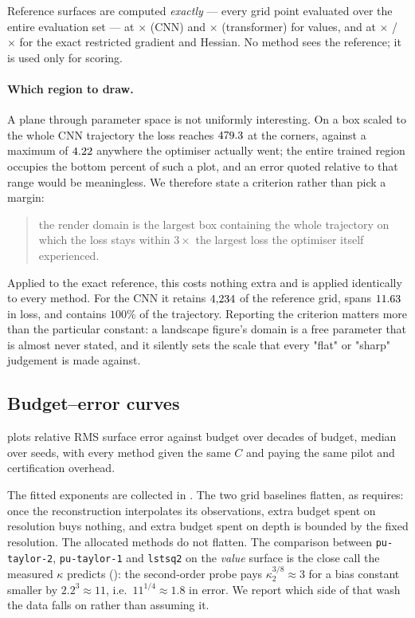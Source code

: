 \documentclass[11pt]{article}
\theoremstyle{definition}
\begin{document}
Reference surfaces are computed \emph{exactly} --- every grid point evaluated over the
entire evaluation set --- at \CNNvres$\times$\CNNvres{} (CNN) and
\GPTvres$\times$\GPTvres{} (transformer) for values, and at
\CNNdres$\times$\CNNdres{} / \GPTdres$\times$\GPTdres{} for the exact restricted
gradient and Hessian. No method sees the reference; it is used only for scoring.

\paragraph{Which region to draw.} A plane through parameter space is not uniformly
interesting. On a box scaled to the whole CNN trajectory the loss reaches
$479.3$ at the corners, against a maximum of $4.22$ anywhere the optimiser
actually went; the entire trained region occupies the bottom percent of such a plot, and
an error quoted relative to that range would be meaningless. We therefore state a
criterion rather than pick a margin:

\begin{quote}
the render domain is the largest box containing the whole trajectory on which the loss
stays within $3\times$ the largest loss the optimiser itself experienced.
\end{quote}

Applied to the exact reference, this costs nothing extra and is applied identically to
every method. For the CNN it retains $4{,}234$ of the reference grid, spans
$11.63$ in loss, and contains $100\%$ of the trajectory. Reporting the
criterion matters more than the particular constant: a landscape figure's domain is a
free parameter that is almost never stated, and it silently sets the scale that every
"flat" or "sharp" judgement is made against.



\subsection{Budget--error curves}

 plots relative RMS surface error against budget over
\CNNbudgetdecades{} decades of budget, median over \CNNseeds{} seeds, with every method
given the same $C$ and paying the same pilot and certification overhead.

The fitted exponents are collected in . The two grid baselines
flatten, as  requires: once the reconstruction interpolates its
observations, extra budget spent on resolution buys nothing, and extra budget spent on
depth is bounded by the fixed resolution. The allocated methods do not flatten. The
comparison between \texttt{pu-taylor-2}, \texttt{pu-taylor-1} and \texttt{lstsq2} on the
\emph{value} surface is the close call the measured $\kappa$ predicts
(): the second-order probe pays $\kappa_2^{3/8}\approx3$ for a bias
constant smaller by $2.2^3\approx11$, i.e.\ $11^{1/4}\approx1.8$ in error. We report
which side of that wash the data falls on rather than assuming it.
\end{document}
